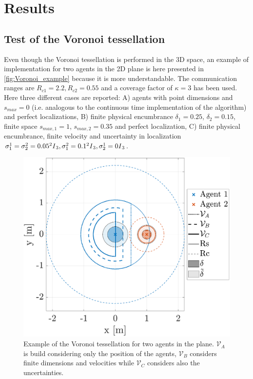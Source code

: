 \section{Results}
\subsection{Test of the Voronoi tessellation}
Even though the Voronoi tessellation is performed in the 3D space, an example of implementation for two agents in the 2D plane is here presented in \autoref{fig:Voronoi_example} because it is more understandable. The communication ranges are $R_{c1}=2.2, R_{c2}=0.55$ and a coverage factor of $\kappa=3$ has been used.  Here three different cases are reported: A) agents with point dimensions and $s_{max}=0$ (i.e. analogous to the continuous time implementation of the algorithm) and perfect localizations, B) finite physical encumbrance $\delta_1=0.25$, $\delta_2=0.15$, finite space $s_{max,1}=1$, $s_{max,2}=0.35$ and perfect localization, C) finite physical encumbrance, finite velocity and uncertainty in localization $\sigma_{1}^1=\sigma_{2}^2=0.05^2 \text{\textit{I}}_3, \sigma_{1}^2=0.1^2 \text{\textit{I}}_3, \sigma_{2}^1=0 \text{\textit{I}}_3$.
\begin{figure}[htb]
\centering
    \includegraphics[width=0.7\columnwidth]{images/fig_Voronoi_example.eps}
    \caption{Example of the Voronoi tessellation for two agents in the plane. $\mathcal{V}_A$ is build considering only the position of the agents, $\mathcal{V}_B$ considers finite dimensions and velocities while $\mathcal{V}_C$ considers also the uncertainties.}
    \label{fig:Voronoi_example}
\end{figure}

